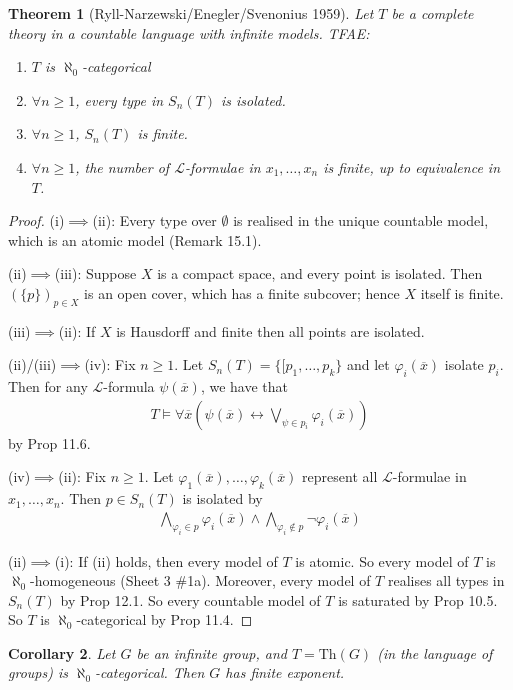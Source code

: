 \documentclass[]{article}
\theoremstyle{custhm}
\newtheorem{theorem}{Theorem}[section]
\theoremstyle{cusdef}
\theoremstyle{custhm}
\theoremstyle{custhm}
\newtheorem{cor}[theorem]{Corollary}
\theoremstyle{custhm}
\theoremstyle{ex}
\theoremstyle{custhm}
\theoremstyle{cusdef}
\theoremstyle{remark}
\theoremstyle{remark}
\renewcommand{\L}{\mathcal{L}}
\renewcommand{\phi}{\varphi}
\renewcommand{\bar}{\overline}
\newcommand{\Th}{\textrm{Th}}
\begin{document}
\begin{theorem}[Ryll-Narzewski/Enegler/Svenonius 1959]
	Let $T$ be a complete theory in a countable language with infinite models. TFAE:
	\begin{enumerate}[label=\emph{\roman*)}]
		\item $T$ is $\aleph_0$-categorical
		\item $\forall n\ge 1$, every type in $S_n(T)$ is isolated.
		\item $\forall n\ge 1$, $S_n(T)$ is finite.
		\item $\forall n\ge 1$, the number of $\L$-formulae in $x_1,\dots,x_n$ is finite, up to equivalence in $T$.
	\end{enumerate}
\end{theorem}
\begin{proof}
	(i)$\implies$(ii): Every type over $\emptyset$ is realised in the unique countable model, which is an atomic model (Remark 15.1).

	(ii)$\implies$(iii): Suppose $X$ is a compact space, and every point is isolated. Then $(\{p\})_{p\in X}$ is an open cover, which has a finite subcover; hence $X$ itself is finite.

	(iii)$\implies$(ii): If $X$ is Hausdorff and finite then all points are isolated.

	(ii)/(iii)$\implies$(iv): Fix $n\ge 1$. Let $S_n(T) = \{[p_1,\dots,p_k\}$ and let $\phi_i(\bar{x})$ isolate $p_i$. Then for any $\L$-formula $\psi(\bar{x})$, we have that
	\begin{align*}
		T\models\forall\bar{x}\left(\psi(\bar{x})\leftrightarrow\bigvee_{\psi\in p_i}\phi_i(\bar{x})\right)
	\end{align*}
	by Prop 11.6.

	(iv)$\implies$(ii): Fix $n\ge 1$. Let $\phi_1(\bar{x}),\dots,\phi_k(\bar{x})$ represent all $\L$-formulae in $x_1,\dots,x_n$. Then $p \in S_n(T)$ is isolated by
	\begin{align*}
		\bigwedge_{\phi_i\in p}\phi_i(\bar{x}) \land \bigwedge_{\phi_i\not\in p}\neg\phi_i(\bar{x})
	\end{align*}

	(ii)$\implies$(i): If (ii) holds, then every model of $T$ is atomic. So every model of $T$ is $\aleph_0$-homogeneous (Sheet 3 \#1a). Moreover, every model of $T$ realises all types in $S_n(T)$ by Prop 12.1. So every countable model of $T$ is saturated by Prop 10.5. So $T$ is $\aleph_0$-categorical by Prop 11.4.
\end{proof}
\begin{cor}
	Let $G$ be an infinite group, and $T = \Th(G)$ (in the language of groups) is $\aleph_0$-categorical. Then $G$ has finite exponent.
\end{cor}
\end{document}
